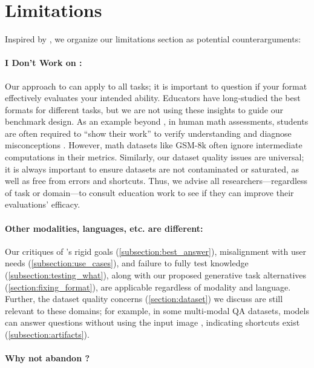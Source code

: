 \section{Limitations} \label{section:limitations}

Inspired by \citet{saxon2024benchmarks}, we organize our limitations section as potential counterarguments:



\paragraph{I Don't Work on \mcqa:}

Our approach to \mcqa can apply to all tasks;
it is important to question if your format effectively evaluates your intended ability.
Educators have long-studied the best formats for different tasks, but we are not using these insights to guide our benchmark design.
As an example beyond \mcqa, in human math assessments, students are often required to ``show their work'' to verify understanding and diagnose misconceptions \cite{choy2016snapshots}. However, math datasets like GSM-8k \cite{cobbe2021training} often ignore intermediate computations in their metrics.
Similarly, our dataset quality issues are universal; it is always important to ensure datasets are not contaminated or saturated, as well as free from errors and shortcuts.
Thus, we advise all researchers---regardless of task or domain---to consult education work to see if they can improve their evaluations' efficacy.

\paragraph{Other modalities, languages, etc. are different:}
Our critiques of \mcqa's rigid goals (\cref{subsection:best_answer}), misalignment with user needs (\cref{subsection:use_cases}), and failure to fully test knowledge (\cref{subsection:testing_what}), along with our proposed generative task alternatives (\cref{section:fixing_format}), are applicable regardless of modality and language.
Further, the \mcqa dataset quality concerns (\cref{section:dataset}) we discuss are still relevant to these domains;
for example, in some multi-modal QA datasets, models can answer questions without using the input image \cite{goyal2017making}, indicating shortcuts exist (\cref{subsection:artifacts}).

\paragraph{Why not abandon \mcqa?}

